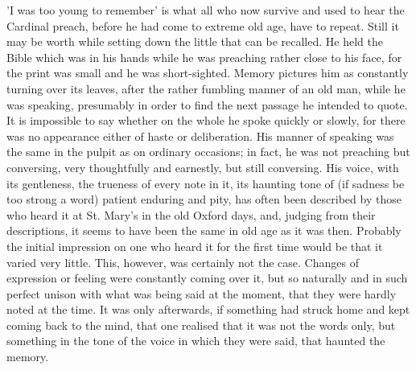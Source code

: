 'I was too young to remember' is what all who now
survive and used to hear the Cardinal preach, before he had come to
extreme old age, have to repeat. Still it may be worth while setting
down the little that can be recalled. He held the Bible which was in
his hands while he was preaching rather close to his face, for the
print was small and he was short-sighted. Memory pictures him as
constantly turning over its leaves, after the rather fumbling manner
of an old man, while he was speaking, presumably in order to find the
next passage he intended to quote. It is impossible to say whether on
the whole he spoke quickly or slowly, for there was no appearance
either of haste or deliberation. His manner of speaking was the same
in the pulpit as on ordinary occasions; in fact, he was not preaching
but conversing, very thoughtfully and earnestly, but still conversing.
His voice, with its gentleness, the trueness of every note in it, its
haunting tone of (if sadness be too strong a word) patient enduring
and pity, has often been described by those who heard it at St. Mary's
in the old Oxford days, and, judging from their descriptions, it seems
to have been the same in old age as it was then. Probably the
initial impression on one who heard it for the first time would be
that it varied very little. This, however, was certainly not the case.
Changes of expression or feeling were constantly coming over it, but
so naturally and in such perfect unison with what was being said at
the moment, that they were hardly noted at the time. It was only
afterwards, if something had struck home and kept coming back to the
mind, that one realised that it was not the words only, but something
in the tone of the voice in which they were said, that haunted the
memory.


